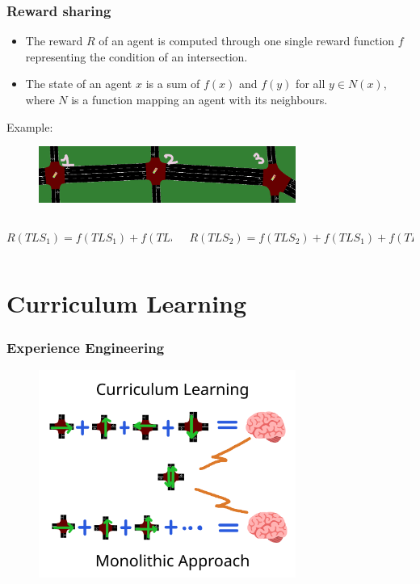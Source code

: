 \documentclass[dvipsnames]{beamer}
\begin{document}
\begin{frame}
\frametitle{Reward sharing}

  {\footnotesize
  \begin{itemize}
    \item The reward $R$ of an agent is computed through one single reward function $f$ representing the condition of an intersection. \\
    \item The state of an agent $x$ is a sum of $f(x)$ and $f(y)$ for all $y \in N(x)$, where $N$ is a function mapping an agent with its neighbours. \\
  \end{itemize}
  }

  Example:
  \begin{figure}
    \centering
    \includegraphics[width=0.75\textwidth]{figures/sumo-rf-tls-triplet.png}
  \end{figure}

  
  \begin{columns}
    \begin{column}{0.4\textwidth}
      \centering
      {\footnotesize$R({TLS}_{1}) = f({TLS}_{1}) + f({TLS}_{2})$}
    \end{column}
    \begin{column}{0.6\textwidth}
      \centering
      {\footnotesize$R({TLS}_{2}) = f({TLS}_{2}) + f({TLS}_{1}) + f({TLS}_{3})$}
    \end{column}
  \end{columns}
\end{frame}

\section{Curriculum Learning}

\begin{frame}
\frametitle{Experience Engineering}
  \begin{figure}
    \centering
    \includegraphics[width=0.75\textwidth]{figures/curriculum-vs-monolithic.png}
  \end{figure}
\end{frame}
\end{document}
